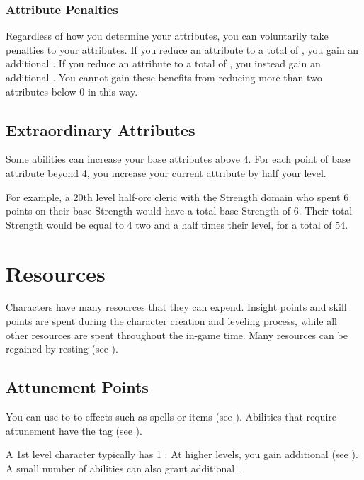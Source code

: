         \subsubsection{Attribute Penalties}\label{Attribute Penalties}
            Regardless of how you determine your attributes, you can voluntarily take penalties to your attributes.
            If you reduce an attribute to a total of , you gain an additional .
            If you reduce an attribute to a total of , you instead gain an additional .
            You cannot gain these benefits from reducing more than two attributes below 0 in this way.

    \subsection{Extraordinary Attributes}
        Some abilities can increase your base attributes above 4.
        For each point of base attribute beyond 4, you increase your current attribute by half your level.

        For example, a 20th level half-orc cleric with the Strength domain who spent 6 points on their base Strength would have a total base Strength of 6.
        Their total Strength would be equal to 4 \add two and a half times their level, for a total of 54.

\section{Resources}\label{Resources}

    Characters have many resources that they can expend.
    Insight points and skill points are spent during the character creation and leveling process, while all other resources are spent throughout the in-game time.
    Many resources can be regained by resting (see ).

    \subsection{Attunement Points}\label{Attunement Points}
        You can use  to  to effects such as spells or items (see ).
        Abilities that require attunement have the  tag (see ).

        A 1st level character typically has 1 .
        At higher levels, you gain additional  (see ).
        A small number of abilities can also grant additional .

